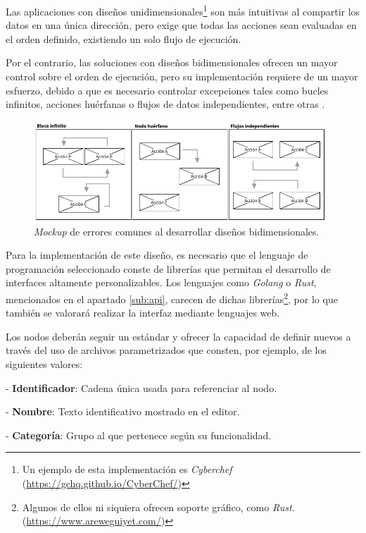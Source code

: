 Las aplicaciones con diseños unidimensionales\footnote{Un ejemplo de esta implementación es \textit{Cyberchef} (\url{https://gchq.github.io/CyberChef/})} son más intuitivas al compartir los datos en una única dirección, pero exige que todas las acciones sean evaluadas en el orden definido, existiendo un solo flujo de ejecución.\sn

Por el contrario, las soluciones con diseños bidimensionales ofrecen un mayor control sobre el orden de ejecución, pero su implementación requiere de un mayor esfuerzo, debido a que es necesario controlar excepciones tales como bucles infinitos, acciones huérfanas o flujos de datos independientes, entre otras .\sn

\begin{figure}[H]
    \centering
    \includegraphics[width=11cm]{img/tables/07_Mockup-Dataflow-Problems.png}
    \caption{\textit{Mockup} de errores comunes al desarrollar diseños bidimensionales.}
    \label{fig:mockupdataflowerrors}
\end{figure}

Para la implementación de este diseño, es necesario que el lenguaje de programación seleccionado conste de librerías que permitan el desarrollo de interfaces altamente personalizables. Los lenguajes como \textit{Golang} o \textit{Rust}, mencionados en el apartado \ref{sub:api}, carecen de dichas librerías\footnote{Algunos de ellos ni siquiera ofrecen soporte gráfico, como \textit{Rust}. (\url{https://www.areweguiyet.com/})}, por lo que también se valorará realizar la interfaz mediante lenguajes web.\sn

Los nodos deberán seguir un estándar y ofrecer la capacidad de definir nuevos a través del uso de archivos parametrizados que consten, por ejemplo, de los siguientes valores:\sn

- \textbf{Identificador}: Cadena única usada para referenciar al nodo.

- \textbf{Nombre}: Texto identificativo mostrado en el editor.

- \textbf{Categoría}: Grupo al que pertenece según su funcionalidad.

